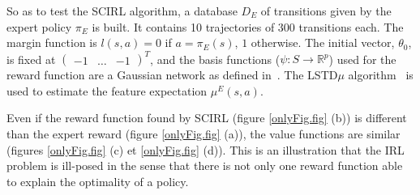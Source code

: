 \documentclass{article}
\begin{document}
%
%
So as to test the SCIRL algorithm, a database $D_E$ of transitions
given by the expert policy $\pi_E$ is built. It contains 10
trajectories of 300 transitions each. The margin function is $l(s,a)
= 0$ if $a=\pi_E(s)$, $1$ otherwise.
The initial vector, $\theta_0$, is fixed at $\begin{pmatrix}   -1 &
\dots & -1
\end{pmatrix}^T$,
and the basis functions ($\psi: S \rightarrow \mathbb{R}^p$) used
for the reward function are a Gaussian network as defined
in~\cite{lagoudakis2003least}. The LSTD$\mu$
algorithm~\cite{klein2011batch} is used to estimate the feature
expectation $\mu^E(s,a)$.

%
Even if the reward function found by SCIRL (figure \ref{onlyFig.fig}
(b)) is different than the expert reward (figure \ref{onlyFig.fig}
(a)), the value functions are similar (figures \ref{onlyFig.fig} (c)
et \ref{onlyFig.fig} (d)). This is an illustration that the IRL
problem is ill-posed in the sense that there is not only one reward
function able to explain the optimality of a policy.
\end{document}
